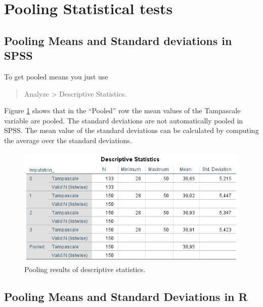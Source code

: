 \documentclass[
]{book}
\begin{document}
\hypertarget{pooling-statistical-tests}{%
\section{Pooling Statistical tests}\label{pooling-statistical-tests}}

\hypertarget{pooling-means-and-standard-deviations-in-spss}{%
\subsection{Pooling Means and Standard deviations in SPSS}\label{pooling-means-and-standard-deviations-in-spss}}

To get pooled means you just use

\begin{quote}
Analyze \textgreater{} Descriptive Statistics.
\end{quote}

Figure \ref{fig:tab5-3} shows that in the ``Pooled'' row the mean values of the Tampascale variable are pooled. The standard deviations are not automatically pooled in SPSS. The mean value of the standard deviations can be calculated by computing the average over the standard deviations.

\begin{figure}

{\centering \includegraphics[width=0.9\linewidth]{images/table5.3} 

}

\caption{Pooling results of descriptive statistics.}\label{fig:tab5-3}
\end{figure}

\hypertarget{pooling-means-and-standard-deviations-in-r}{%
\subsection{Pooling Means and Standard Deviations in R}\label{pooling-means-and-standard-deviations-in-r}}
\end{document}
